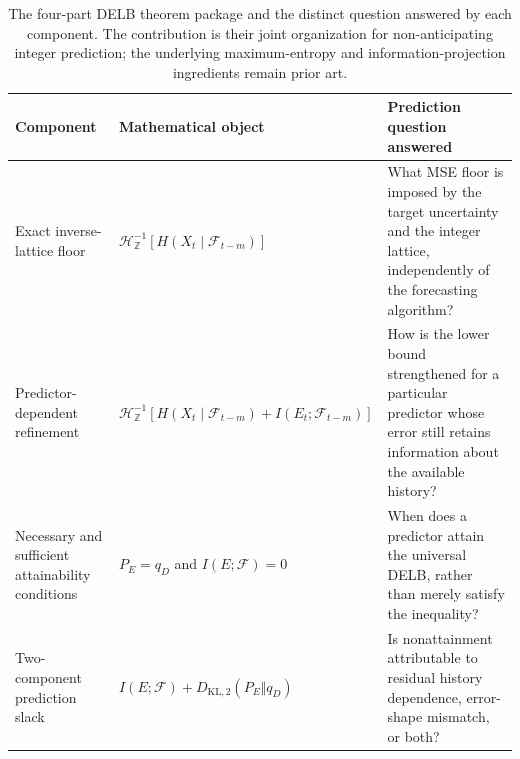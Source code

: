 \begin{table}[!t]
\caption{The four-part DELB theorem package and the distinct question
answered by each component. The contribution is their joint organization
for non-anticipating integer prediction; the underlying maximum-entropy and
information-projection ingredients remain prior art.}
\label{tab:delb_theorem_package}
\centering
\footnotesize
\setlength{\tabcolsep}{4pt}
\begin{tabularx}{\textwidth}{
    >{\RaggedRight\arraybackslash}p{}
    >{\RaggedRight\arraybackslash}p{}
    >{\RaggedRight\arraybackslash}X}
\toprule
\textbf{Component} & \textbf{Mathematical object} &
\textbf{Prediction question answered}\\
\midrule
Exact inverse-lattice floor
&
\(\mathcal H_{\mathbb Z}^{-1}
 [H(X_t\mid\mathcal F_{t-m})]\)
&
What MSE floor is imposed by the target uncertainty and the integer lattice,
independently of the forecasting algorithm?\\

Predictor-dependent refinement
&
\(\mathcal H_{\mathbb Z}^{-1}
 [H(X_t\mid\mathcal F_{t-m})+I(E_t;\mathcal F_{t-m})]\)
&
How is the lower bound strengthened for a particular predictor whose error
still retains information about the available history?\\

Necessary and sufficient attainability conditions
&
\(P_E=q_D\) and \(I(E;\mathcal F)=0\)
&
When does a predictor attain the universal DELB, rather than merely satisfy
the inequality?\\

Two-component prediction slack
&
\(I(E;\mathcal F)+D_{\mathrm{KL},2}(P_E\Vert q_D)\)
&
Is nonattainment attributable to residual history dependence, error-shape
mismatch, or both?\\
\bottomrule
\end{tabularx}
\end{table}
